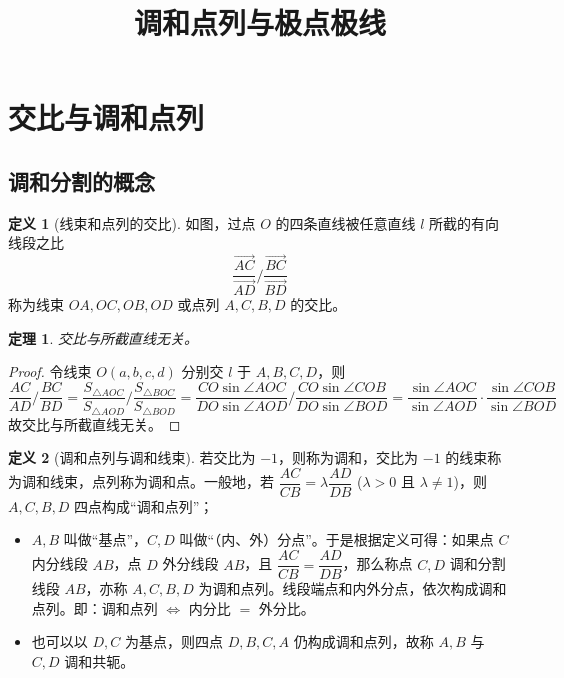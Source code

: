 \documentclass[UTF8,12pt]{ctexart}
\title{调和点列与极点极线}
\author{}
\date{}
\theoremstyle{plain} %
\newtheorem{theorem}{定理}[section]
\theoremstyle{definition} %
\newtheorem{definition}{定义}[section]
\theoremstyle{remark} %
\begin{document}
\maketitle
\tableofcontents

\section{交比与调和点列}
\subsection{调和分割的概念}

\begin{definition}[线束和点列的交比]
如图，过点 $O$ 的四条直线被任意直线 $l$ 所截的有向线段之比 
\[\dfrac{\overrightarrow{AC}}{\overrightarrow{AD}} \Big/ \dfrac{\overrightarrow{BC}}{\overrightarrow{BD}}\]
称为线束 $OA, OC, OB, OD$ 或点列 $A, C, B, D$ 的交比。
\end{definition}

\begin{theorem}
交比与所截直线无关。
\end{theorem}
\begin{proof}
令线束 $O(a,b,c,d)$ 分别交 $l$ 于 $A,B,C,D$，则
\[\frac{AC}{AD} \Big/ \frac{BC}{BD} = 
\frac{S_{\triangle AOC}}{S_{\triangle AOD}} \Big/ \frac{S_{\triangle BOC}}{S_{\triangle BOD}}
= \frac{CO\sin\angle AOC}{DO\sin\angle AOD} \Big/ \frac{CO\sin\angle COB}{DO\sin\angle BOD}
= \frac{\sin\angle AOC}{\sin\angle AOD} \cdot \frac{\sin\angle COB}{\sin\angle BOD}\]
故交比与所截直线无关。
\end{proof}

\begin{definition}[调和点列与调和线束]
若交比为 $-1$，则称为调和，交比为 $-1$ 的线束称为调和线束，点列称为调和点。一般地，若 $\dfrac{AC}{CB} = \lambda \dfrac{AD}{DB}$ ($\lambda > 0$ 且 $\lambda \neq 1$)，则 $A,C,B,D$ 四点构成“调和点列”；
\begin{itemize}
\item $A,B$ 叫做“基点”，$C,D$ 叫做“（内、外）分点”。于是根据定义可得：如果点 $C$ 内分线段 $AB$，点 $D$ 外分线段 $AB$，且 $\dfrac{AC}{CB} = \dfrac{AD}{DB}$，那么称点 $C,D$ 调和分割线段 $AB$，亦称 $A,C,B,D$ 为调和点列。线段端点和内外分点，依次构成调和点列。即：调和点列 $\Leftrightarrow$ 内分比 $=$ 外分比。
\item 也可以以 $D,C$ 为基点，则四点 $D,B,C,A$ 仍构成调和点列，故称 $A,B$ 与 $C,D$ 调和共轭。
\end{itemize}
\end{definition}
\end{document}
